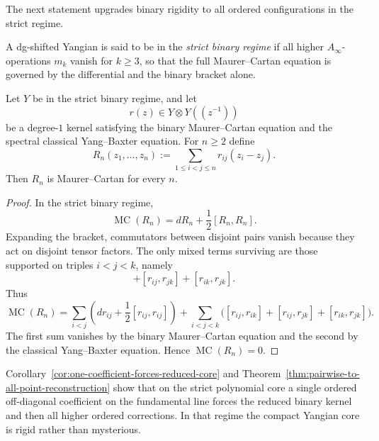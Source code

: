 The next statement upgrades binary rigidity to all ordered
configurations in the strict regime.

\begin{definition}
\label{def:strict-binary-regime}
A dg-shifted Yangian is said to be in the \emph{strict binary regime} if
all higher $A_\infty$-operations $m_k$ vanish for $k\ge 3$, so that the
full Maurer--Cartan equation is governed by the differential and the
binary bracket alone.
\end{definition}

\begin{theorem}
\ClaimStatusProvedHere
\label{thm:pairwise-to-all-point-reconstruction}
Let $Y$ be in the strict binary regime, and let
\begin{equation}
r(z)\in Y\otimes Y((z^{-1}))
\end{equation}
be a degree-$1$ kernel satisfying the binary Maurer--Cartan equation and
the spectral classical Yang--Baxter equation. For $n\ge 2$ define
\begin{equation}
R_n(z_1,\dots,z_n):=\sum_{1\le i<j\le n} r_{ij}(z_i-z_j).
\end{equation}
Then $R_n$ is Maurer--Cartan for every $n$.
\end{theorem}

\begin{proof}
In the strict binary regime,
\begin{equation}
\operatorname{MC}(R_n)=dR_n+\frac12[R_n,R_n].
\end{equation}
Expanding the bracket, commutators between disjoint pairs vanish because
they act on disjoint tensor factors. The only mixed terms surviving are
those supported on triples $i<j<k$, namely
\begin{equation}
[r_{ij},r_{ik}]+[r_{ij},r_{jk}]+[r_{ik},r_{jk}].
\end{equation}
Thus
\begin{equation}
\operatorname{MC}(R_n)
=
\sum_{i<j}\left(dr_{ij}+\frac12[r_{ij},r_{ij}]\right)
+
\sum_{i<j<k}\Big([r_{ij},r_{ik}]+[r_{ij},r_{jk}]+[r_{ik},r_{jk}]\Big).
\end{equation}
The first sum vanishes by the binary Maurer--Cartan equation and the
second by the classical Yang--Baxter equation. Hence
$\operatorname{MC}(R_n)=0$.
\end{proof}

\begin{remark}
\label{rem:compact-core-consequence}
Corollary~\ref{cor:one-coefficient-forces-reduced-core} and
Theorem~\ref{thm:pairwise-to-all-point-reconstruction} show that on the
strict polynomial core a single ordered off-diagonal coefficient on the
fundamental line forces the reduced binary kernel and then all higher
ordered corrections. In that regime the compact Yangian core is rigid
rather than mysterious.
\end{remark}

